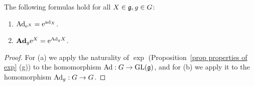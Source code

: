 \begin{thm}\label{thm 1.5.2 DK}
    The following formulas hold for all $X\in\mathfrak{g},g\in G$:
    \begin{enumerate}[label=(\alph*)]
        \item $\mathrm{Ad}_{\mathrm{e}^X}=\mathrm{e}^{\mathrm{ad}_X}$.
        \item $\mathrm{\mathbf{Ad}}_g \mathrm{e}^X=\mathrm{e}^{\mathrm{Ad}_g X}$.
    \end{enumerate}
\end{thm}
\begin{proof}
    For (a) we apply the naturality of $\exp$ (Proposition~\ref{prop properties of exp} (g)) to the homomorphism $\mathrm{Ad}:G\to \operatorname{GL}(\mathfrak{g})$, and for (b) we apply it to the homomorphism $\mathrm{Ad}_g:G\to G$.
\end{proof}



